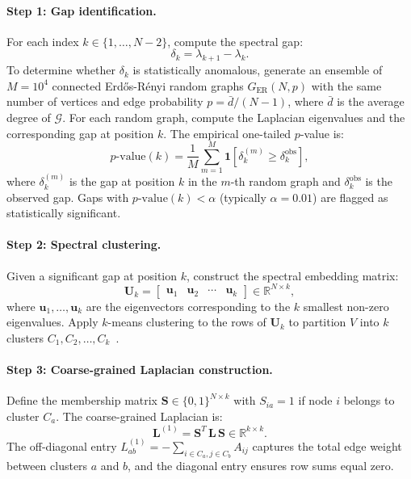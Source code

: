 \paragraph{Step 1: Gap identification.}
For each index $k \in \{1, \ldots, N-2\}$, compute the spectral gap:
\begin{equation}
\delta_k = \lambda_{k+1} - \lambda_k.
\label{eq:spectral_gap}
\end{equation}
To determine whether $\delta_k$ is statistically anomalous, generate an
ensemble of $M = 10^4$ connected Erd\H{o}s-R\'enyi random graphs
$G_{\text{ER}}(N, p)$ with the same number of vertices and edge
probability $p = \bar{d}/(N-1)$, where $\bar{d}$ is the average degree
of $\mathcal{G}$.  For each random graph, compute the Laplacian
eigenvalues and the corresponding gap at position $k$.  The empirical
one-tailed $p$-value is:
\begin{equation}
p\text{-value}(k) = \frac{1}{M} \sum_{m=1}^{M}
\mathbf{1}\!\left[\delta_k^{(m)} \geq \delta_k^{\text{obs}}\right],
\label{eq:gap_pvalue}
\end{equation}
where $\delta_k^{(m)}$ is the gap at position $k$ in the $m$-th random
graph and $\delta_k^{\text{obs}}$ is the observed gap.  Gaps with
$p\text{-value}(k) < \alpha$ (typically $\alpha = 0.01$) are flagged
as statistically significant.

\paragraph{Step 2: Spectral clustering.}
Given a significant gap at position $k$, construct the spectral embedding
matrix:
\begin{equation}
\mathbf{U}_k = \begin{bmatrix}
\mathbf{u}_1 & \mathbf{u}_2 & \cdots & \mathbf{u}_k
\end{bmatrix} \in \mathbb{R}^{N \times k},
\label{eq:spectral_embedding}
\end{equation}
where $\mathbf{u}_1, \ldots, \mathbf{u}_k$ are the eigenvectors
corresponding to the $k$ smallest non-zero eigenvalues.  Apply $k$-means
clustering to the rows of $\mathbf{U}_k$ to partition $V$ into $k$
clusters $C_1, C_2, \ldots, C_k$~\cite{ng2002spectral,luxburg2007tutorial}.

\paragraph{Step 3: Coarse-grained Laplacian construction.}
Define the membership matrix $\mathbf{S} \in \{0,1\}^{N \times k}$
with $S_{ia} = 1$ if node $i$ belongs to cluster $C_a$.  The
coarse-grained Laplacian is:
\begin{equation}
\mathbf{L}^{(1)} = \mathbf{S}^T\,\mathbf{L}\,\mathbf{S}
\in \mathbb{R}^{k \times k}.
\label{eq:cg_laplacian}
\end{equation}
The off-diagonal entry $L^{(1)}_{ab} = -\sum_{i \in C_a, j \in C_b}
A_{ij}$ captures the total edge weight between clusters $a$ and $b$,
and the diagonal entry ensures row sums equal zero.


